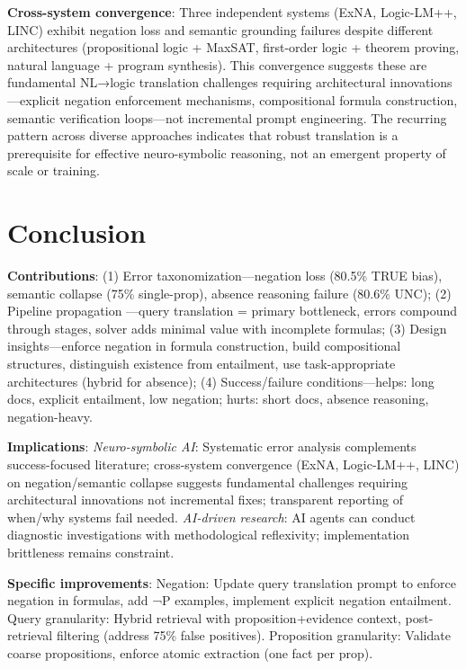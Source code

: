\documentclass[12pt,a4paper]{article}
\begin{document}
\textbf{Cross-system convergence}: Three independent systems (ExNA, Logic-LM++, LINC) exhibit negation loss and semantic grounding failures despite different architectures (propositional logic + MaxSAT, first-order logic + theorem proving, natural language + program synthesis). This convergence suggests these are fundamental NL→logic translation challenges requiring architectural innovations—explicit negation enforcement mechanisms, compositional formula construction, semantic verification loops—not incremental prompt engineering. The recurring pattern across diverse approaches indicates that robust translation is a prerequisite for effective neuro-symbolic reasoning, not an emergent property of scale or training.

\section{Conclusion}

\textbf{Contributions}: (1) Error taxonomization—negation loss (80.5\% TRUE bias), semantic collapse (75\% single-prop), absence reasoning failure (80.6\% UNC); (2) Pipeline propagation  —query translation = primary bottleneck, errors compound through stages, solver adds minimal value with incomplete formulas; (3) Design insights—enforce negation in formula construction, build compositional structures, distinguish existence from entailment, use task-appropriate architectures (hybrid for absence); (4) Success/failure conditions—helps: long docs, explicit entailment, low negation; hurts: short docs, absence reasoning, negation-heavy.

\textbf{Implications}: \textit{Neuro-symbolic AI}: Systematic error analysis complements success-focused literature; cross-system convergence (ExNA, Logic-LM++, LINC) on negation/semantic collapse suggests fundamental challenges requiring architectural innovations not incremental fixes; transparent reporting of when/why systems fail needed. \textit{AI-driven research}: AI agents can conduct diagnostic investigations with methodological reflexivity; implementation brittleness remains constraint.

\textbf{Specific improvements}: Negation: Update query translation prompt to enforce negation in formulas, add ¬P examples, implement explicit negation entailment. Query granularity: Hybrid retrieval with proposition+evidence context, post-retrieval filtering (address 75\% false positives). Proposition granularity: Validate coarse propositions, enforce atomic extraction (one fact per prop).
\end{document}
